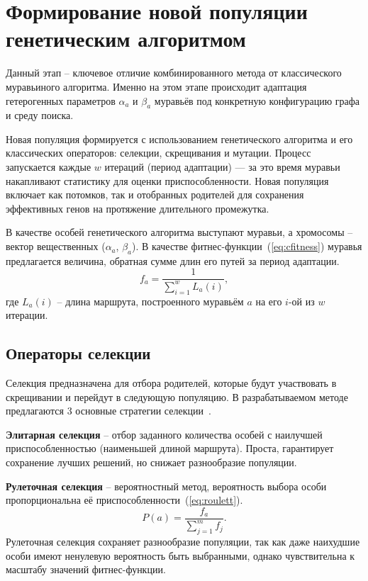 \section{Формирование новой популяции генетическим алгоритмом}

Данный этап -- ключевое отличие комбинированного метода от классического муравьиного алгоритма. Именно на этом этапе происходит адаптация гетерогенных параметров $\alpha_a$ и $\beta_a$ муравьёв под конкретную конфигурацию графа и среду поиска.

Новая популяция формируется с использованием генетического алгоритма и его классических операторов: селекции, скрещивания и мутации. Процесс запускается каждые $w$ итераций (период адаптации) — за это время муравьи накапливают статистику для оценки приспособленности. Новая популяция включает как потомков, так и отобранных родителей для сохранения эффективных генов на протяжение длительного промежутка.

В качестве особей генетического алгоритма выступают муравьи, а  хромосомы -- вектор вещественных ($\alpha_a$, $\beta_a$). В качестве фитнес-функции~(\ref{eq:cfitness}) муравья предлагается величина, обратная сумме длин его путей за период адаптации.
\begin{equation}
	f_a=\frac{1}{\sum_{i=1}^{w}L_a(i)},
	\label{eq:cfitness}
\end{equation}
где $L_a(i)$ -- длина маршрута, построенного муравьём $a$ на его $i$-ой из $w$ итерации.

\subsection{Операторы селекции}

Селекция предназначена для отбора родителей, которые будут участвовать в скрещивании и перейдут в следующую популяцию. В разрабатываемом методе предлагаются 3 основные стратегии селекции~\cite{genetic-engineer}.

\textbf{Элитарная селекция} -- отбор заданного количества особей с наилучшей приспособленностью (наименьшей длиной маршрута). Проста, гарантирует сохранение лучших решений, но снижает разнообразие популяции.

\textbf{Рулеточная селекция} -- вероятностный метод, вероятность выбора особи пропорциональна её приспособленности~(\ref{eq:roulett}).
\begin{equation}
P(a)=\frac{f_a}{\sum_{j=1}^{m}f_j}.
\label{eq:roulett}
\end{equation}
Рулеточная селекция сохраняет разнообразие популяции, так как даже наихудшие особи имеют ненулевую вероятность быть выбранными, однако чувствительна к масштабу значений фитнес-функции.


